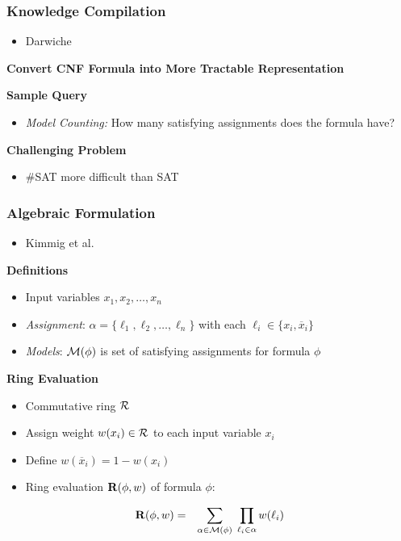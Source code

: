 \documentclass[t,pdf]{beamer}
\newcommand{\reference}[1]{}
\newcommand{\obar}[1]{\overline{#1}}
\newcommand{\xnot}{\obar{x}}
\begin{document}
\begin{frame}
  \frametitle{Knowledge Compilation}
  \begin{itemize}
  \item Darwiche \reference{DarMar-2002}
  \end{itemize}

\medskip

  {\bf Convert CNF Formula into More Tractable Representation}

  \medskip
  {\bf Sample Query}
  \begin{itemize}
  \item {\em Model Counting:} How many satisfying assignments does the formula have?
  \end{itemize}

\medskip
  {\bf Challenging Problem}
  \begin{itemize}
  \item \#SAT more difficult than SAT
  \end{itemize}
\medskip

\end{frame}

\begin{frame}

   \frametitle{Algebraic Formulation}
   \begin{itemize}
     \item Kimmig et al. \reference{KimVdbDra-2017}
   \end{itemize}
\medskip
{\bf Definitions}
\begin{itemize}
  \item Input variables $x_1, x_2, \ldots, x_n$
  \item {\em Assignment}: $\alpha = \{ \ell_1, \ell_2, \ldots, \ell_n \}$ with each $\ell_i \in \{x_i, \xnot_i\}$
  \item {\em Models}: ${\cal M}(\phi)$ is set of satisfying assignments for formula $\phi$
\end{itemize}

\medskip
{\bf Ring Evaluation}
\begin{itemize}
     \item Commutative ring ${\cal R}$ 
     \item Assign weight $w(x_i) \in {\cal R}$ to each input variable $x_i$
     \item Define $w(\xnot_i) = 1-w(x_i)$
     \item Ring evaluation ${\bf R}(\phi, w)$ of formula $\phi$:
   \end{itemize}
   \begin{eqnarray*}
     {\bf R}(\phi, w) & = & \sum_{\alpha \in {\cal M}(\phi)} \; \prod_{\ell_i \in \alpha} w(\ell_i)
   \end{eqnarray*}
\end{frame}
\end{document}
